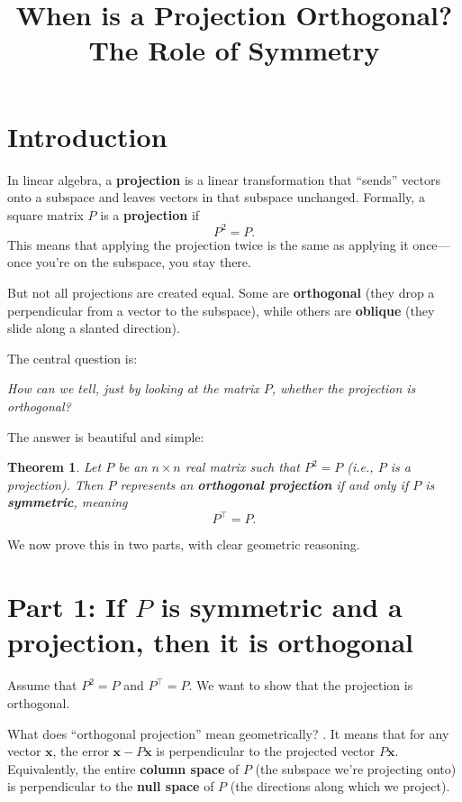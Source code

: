 \documentclass{article}
\title{When is a Projection Orthogonal? \\ The Role of Symmetry}
\author{}
\date{}
\newtheorem{theorem}{Theorem}
\begin{document}
\maketitle

\Large


\section*{Introduction}

In linear algebra, a \textbf{projection} is a linear transformation that “sends” vectors onto a subspace and leaves vectors in that subspace unchanged. Formally, a square matrix \( P \) is a \textbf{projection} if
\[
P^2 = P.
\]
This means that applying the projection twice is the same as applying it once—once you’re on the subspace, you stay there.

But not all projections are created equal. Some are \textbf{orthogonal} (they drop a perpendicular from a vector to the subspace), while others are \textbf{oblique} (they slide along a slanted direction). 

The central question is:
\begin{center}
\textit{How can we tell, just by looking at the matrix \( P \), whether the projection is orthogonal?}
\end{center}

The answer is beautiful and simple:

\begin{theorem}
Let \( P \) be an \( n \times n \) real matrix such that \( P^2 = P \) (i.e., \( P \) is a projection).  
Then \( P \) represents an \textbf{orthogonal projection} if and only if \( P \) is \textbf{symmetric}, meaning
\[
P^\top = P.
\]
\end{theorem}

We now prove this in two parts, with clear geometric reasoning.

\section*{Part 1: If \( P \) is symmetric and a projection, then it is orthogonal}

Assume that \( P^2 = P \) and \( P^\top = P \). We want to show that the projection is orthogonal.

What does “orthogonal projection” mean geometrically?  .
It means that for any vector \( \mathbf{x} \), the error \( \mathbf{x} - P\mathbf{x} \) is perpendicular to the projected vector \( P\mathbf{x} \).  
Equivalently, the entire \textbf{column space} of \( P \) (the subspace we’re projecting onto) is perpendicular to the \textbf{null space} of \( P \) (the directions along which we project).
\end{document}
